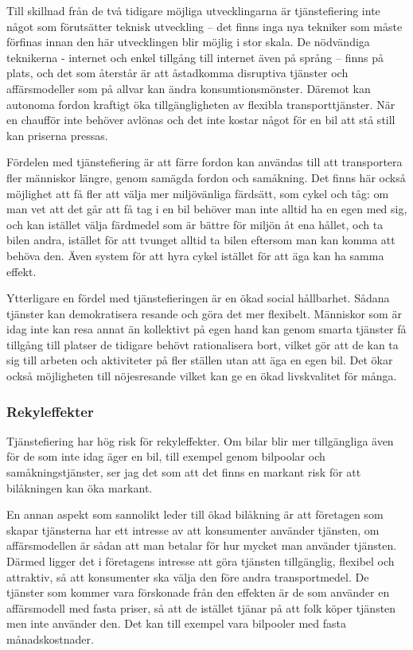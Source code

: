 \documentclass{article}
\begin{document}
Till skillnad från de två tidigare möjliga utvecklingarna är tjänstefiering inte något som förutsätter teknisk utveckling – det finns inga nya tekniker som måste förfinas innan den här utvecklingen blir möjlig i stor skala. De nödvändiga teknikerna - internet och enkel tillgång till internet även på språng – finns på plats, och det som återstår är att åstadkomma disruptiva tjänster och affärsmodeller som på allvar kan ändra konsumtionsmönster. Däremot kan autonoma fordon kraftigt öka tillgängligheten av flexibla transporttjänster. När en chaufför inte behöver avlönas och det inte kostar något för en bil att stå still kan priserna pressas.

Fördelen med tjänstefiering är att färre fordon kan användas till att transportera fler människor längre, genom samägda fordon och samåkning. Det finns här också möjlighet att få fler att välja mer miljövänliga färdsätt, som cykel och tåg: om man vet att det går att få tag i en bil behöver man inte alltid ha en egen med sig, och kan istället välja färdmedel som är bättre för miljön åt ena hållet, och ta bilen andra, istället för att tvunget alltid ta bilen eftersom man kan komma att behöva den. Även system för att hyra cykel istället för att äga kan ha samma effekt.

Ytterligare en fördel med tjänstefieringen är en ökad social hållbarhet. Sådana tjänster kan demokratisera resande och göra det mer flexibelt. Människor som är idag inte kan resa annat än kollektivt på egen hand kan genom smarta tjänster få tillgång till platser de tidigare behövt rationalisera bort, vilket gör att de kan ta sig till arbeten och aktiviteter på fler ställen utan att äga en egen bil. Det ökar också möjligheten till nöjesresande vilket kan ge en ökad livskvalitet för många.

\subsubsection{Rekyleffekter}

Tjänstefiering har hög risk för rekyleffekter. Om bilar blir mer tillgängliga även för de som inte idag äger en bil, till exempel genom bilpoolar och samåkningstjänster, ser jag det som att det finns en markant risk för att bilåkningen kan öka markant.

En annan aspekt som sannolikt leder till ökad bilåkning är att företagen som skapar tjänsterna har ett intresse av att konsumenter använder tjänsten, om affärsmodellen är sådan att man betalar för hur mycket man använder tjänsten. Därmed ligger det i företagens intresse att göra tjänsten tillgänglig, flexibel och attraktiv, så att konsumenter ska välja den före andra transportmedel. De tjänster som kommer vara förskonade från den effekten är de som använder en affärsmodell med fasta priser, så att de istället tjänar på att folk köper tjänsten men inte använder den. Det kan till exempel vara bilpooler med fasta månadskostnader.
\end{document}
